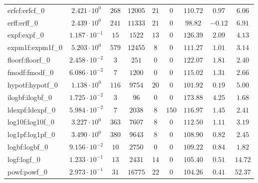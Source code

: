 \begin{tabular}{|l|c|c|c|c|c|c|c|c|}
erfcf:erfcf\_0               & $ 2.421 \cdot 10^{0}  $ & $ 268    $ & $ 12005  $ & $ 21  $ & $ 0    $ & $ 110.72      $ & $ 0.97    $ & $ 6.06    $ \\
erff:erff\_0                 & $ 2.439 \cdot 10^{0}  $ & $ 241    $ & $ 11333  $ & $ 21  $ & $ 0    $ & $ 98.82       $ & $ -0.12   $ & $ 6.91    $ \\
expf:expf\_0                 & $ 1.187 \cdot 10^{-1} $ & $ 15     $ & $ 1522   $ & $ 13  $ & $ 0    $ & $ 126.39      $ & $ 2.09    $ & $ 4.13    $ \\
expm1f:expm1f\_0             & $ 5.203 \cdot 10^{0}  $ & $ 579    $ & $ 12455  $ & $ 8   $ & $ 0    $ & $ 111.27      $ & $ 1.01    $ & $ 3.14    $ \\
floorf:floorf\_0             & $ 2.458 \cdot 10^{-2} $ & $ 3      $ & $ 251    $ & $ 0   $ & $ 0    $ & $ 122.07      $ & $ 1.81    $ & $ 2.40    $ \\
fmodf:fmodf\_0               & $ 6.086 \cdot 10^{-2} $ & $ 7      $ & $ 1200   $ & $ 0   $ & $ 0    $ & $ 115.02      $ & $ 1.31    $ & $ 2.66    $ \\
hypotf:hypotf\_0             & $ 1.138 \cdot 10^{0}  $ & $ 116    $ & $ 9754   $ & $ 20  $ & $ 0    $ & $ 101.92      $ & $ 0.19    $ & $ 5.00    $ \\
ilogbf:ilogbf\_0             & $ 1.725 \cdot 10^{-2} $ & $ 3      $ & $ 96     $ & $ 0   $ & $ 0    $ & $ 173.88      $ & $ 4.25    $ & $ 1.68    $ \\
ldexpf:ldexpf\_0             & $ 5.984 \cdot 10^{-2} $ & $ 7      $ & $ 2038   $ & $ 8   $ & $ 150  $ & $ 116.97      $ & $ 1.45    $ & $ 2.41    $ \\
log10f:log10f\_0             & $ 3.227 \cdot 10^{0}  $ & $ 363    $ & $ 7607   $ & $ 8   $ & $ 0    $ & $ 112.50      $ & $ 1.11    $ & $ 3.19    $ \\
log1pf:log1pf\_0             & $ 3.490 \cdot 10^{0}  $ & $ 380    $ & $ 9643   $ & $ 8   $ & $ 0    $ & $ 108.90      $ & $ 0.82    $ & $ 2.45    $ \\
logbf:logbf\_0               & $ 9.156 \cdot 10^{-2} $ & $ 10     $ & $ 2750   $ & $ 0   $ & $ 0    $ & $ 109.22      $ & $ 0.84    $ & $ 1.82    $ \\
logf:logf\_0                 & $ 1.233 \cdot 10^{-1} $ & $ 13     $ & $ 2431   $ & $ 14  $ & $ 0    $ & $ 105.40      $ & $ 0.51    $ & $ 14.72   $ \\
powf:powf\_0                 & $ 2.973 \cdot 10^{-1} $ & $ 31     $ & $ 16775  $ & $ 22  $ & $ 0    $ & $ 104.26      $ & $ 0.41    $ & $ 52.37   $ \\

\end{tabular}
